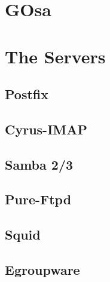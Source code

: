 \documentclass[a4paper,english,10pt]{book}
\begin{document}


\chapter{GOsa}

\chapter{The Servers}
\label{servers}
\section{Postfix}
\section{Cyrus-IMAP}
\section{Samba 2/3}
\section{Pure-Ftpd}
\section{Squid}
\section{Egroupware}



\end{document}
